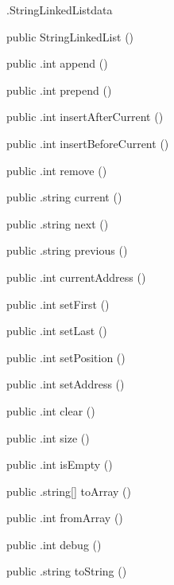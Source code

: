 \begin{CrexxClass}{.StringLinkedList}{data}

  \begin{Hierarchy}
  \end{Hierarchy}

  \begin{Members}

    \Factory
      {public}
      {StringLinkedList}
      {()}

    \Method
      {public}
      {.int}
      {append}
      {()}

    \Method
      {public}
      {.int}
      {prepend}
      {()}

    \Method
      {public}
      {.int}
      {insertAfterCurrent}
      {()}

    \Method
      {public}
      {.int}
      {insertBeforeCurrent}
      {()}

    \Method
      {public}
      {.int}
      {remove}
      {()}

    \Method
      {public}
      {.string}
      {current}
      {()}

    \Method
      {public}
      {.string}
      {next}
      {()}

    \Method
      {public}
      {.string}
      {previous}
      {()}

    \Method
      {public}
      {.int}
      {currentAddress}
      {()}

    \Method
      {public}
      {.int}
      {setFirst}
      {()}

    \Method
      {public}
      {.int}
      {setLast}
      {()}

    \Method
      {public}
      {.int}
      {setPosition}
      {()}

    \Method
      {public}
      {.int}
      {setAddress}
      {()}

    \Method
      {public}
      {.int}
      {clear}
      {()}

    \Method
      {public}
      {.int}
      {size}
      {()}

    \Method
      {public}
      {.int}
      {isEmpty}
      {()}

    \Method
      {public}
      {.string[]}
      {toArray}
      {()}

    \Method
      {public}
      {.int}
      {fromArray}
      {()}

    \Method
      {public}
      {.int}
      {debug}
      {()}

    \Method
      {public}
      {.string}
      {toString}
      {()}

  \end{Members}
\end{CrexxClass}

